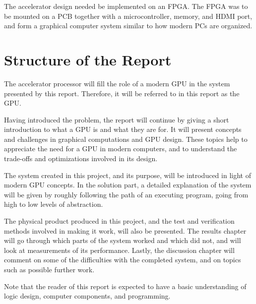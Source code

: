 \documentclass[../main/report.tex]{subfiles}
\begin{document}
The accelerator design needed be implemented on an FPGA.
The FPGA was to be mounted on a PCB together with a microcontroller, memory, and HDMI port, and form a graphical computer system similar to how modern PCs are organized.


\section{Structure of the Report}

The accelerator processor will fill the role of a modern GPU in the system presented by this report.
Therefore, it will be referred to in this report as the GPU.

Having introduced the problem, the report will continue by giving a short introduction to what a GPU is and what they are for.
It will present concepts and challenges in graphical computations and GPU design.
These topics help to appreciate the need for a GPU in modern computers, and to understand the trade-offs and optimizations involved in its design.

The system created in this project, and its purpose, will be introduced in light of modern GPU concepts.
In the solution part, a detailed explanation of the system will be given by roughly following the path of an executing program, going from high to low levels of abstraction.

The physical product produced in this project, and the test and verification methods involved in making it work, will also be presented.
The results chapter will go through which parts of the system worked and which did not, and will look at measurements of its performance.
Lastly, the discussion chapter will comment on some of the difficulties with the completed system, and on topics such as possible further work.

Note that the reader of this report is expected to have a basic understanding of logic design, computer components, and programming.
\end{document}
